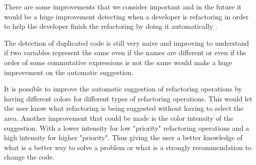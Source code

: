
There are some improvements that we consider important and in the future it would  %
be a huge improvement detecting when a developer is refactoring in order to help the developer finish the
refactoring by doing it automatically \cite{ge2012reconciling}.

The detection of duplicated code is still very naive and improving to understand if
two variables represent the same even if the names are different or even if the
 order of some commutative expressions is not the same would make a huge improvement
 on the automatic suggestion.



It is possible to improve the automatic suggestion of refactoring operations by
having different colors for different types of refactoring operations.
This would let the user know what refactoring is being suggested without having to
select the area.
Another improvement that could be made is the color intensity of the suggestion.
With a lower intensity for low "priority" refactoring operations and a high intensity
for higher "priority". Thus giving the user a better knowledge of what is a better
way to solve a problem or what is a strongly recommendation to change the code.
